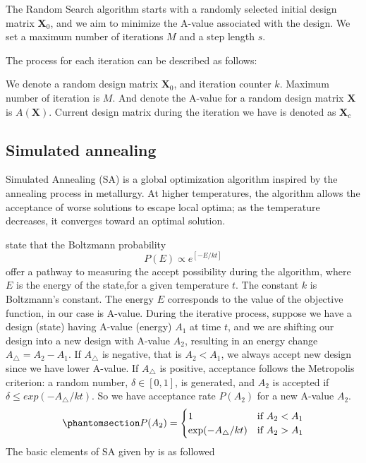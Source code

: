 \documentclass[
  a4paper,
  oneside,
  openany,
  12pt,
  onecolumn]{book}
\theoremstyle{plain}
\theoremstyle{definition}
\theoremstyle{remark}
\begin{document}
The Random Search algorithm starts with a randomly selected initial
design matrix \(\boldsymbol{X}_0\), and we aim to minimize the A-value
associated with the design. We set a maximum number of iterations \(M\)
and a step length \(s\).

The process for each iteration can be described as follows:

We denote a random design matrix \(\boldsymbol{X}_0\), and iteration
counter \(k\). Maximum number of iteration is \(M\). And denote the
A-value for a random design matrix \(\boldsymbol{X}\) is
\(A(\boldsymbol{X})\). Current design matrix during the iteration we
have is denoted as \(\boldsymbol{X}_c\)

\subsection{Simulated annealing}\label{simulated-annealing}

Simulated Annealing (SA) is a global optimization algorithm inspired by
the annealing process in metallurgy. At higher temperatures, the
algorithm allows the acceptance of worse solutions to escape local
optima; as the temperature decreases, it converges toward an optimal
solution.

\citet{butler2013optimal} state that the Boltzmann probability \[
P(E)\propto e^{[-E/kt]}
\] offer a pathway to measuring the accept possibility during the
algorithm, where \(E\) is the energy of the state,for a given
temperature \(t\). The constant \(k\) is Boltzmann's constant. The
energy \(E\) corresponds to the value of the objective function, in our
case is A-value. During the iterative process, suppose we have a design
(state) having A-value (energy) \(A_1\) at time \(t\), and we are
shifting our design into a new design with A-value \(A_2\), resulting in
an energy change \(A_{\bigtriangleup} = A_2 - A_1\). If
\(A_{\bigtriangleup}\) is negative, that is \(A_2 < A_1\), we always
accept new design since we have lower A-value. If \(A_{\bigtriangleup}\)
is positive, acceptance follows the Metropolis criterion: a random
number, \(\delta \in [0,1]\), is generated, and \(A_2\) is accepted if
\(\delta \leq exp(-A_{\bigtriangleup}/kt)\). So we have acceptance rate
\(P(A_2)\) for a new A-value \(A_2\).
\begin{equation}\phantomsection\label{eq-prob}{
P(A_2)=
\begin{cases}
1 & \text{if } A_2<A_1 \\
\exp(-A_{\bigtriangleup}/kt) & \text{if } A_2>A_1\\
\end{cases}
}\end{equation} The basic elements of SA given by
\citet{bertsimas1993simulated} is as followed
\end{document}
